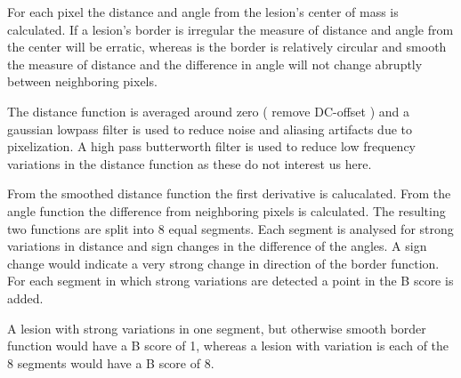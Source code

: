For each pixel the distance and angle from the lesion's center of mass is calculated. If a lesion's border is irregular the measure of distance and angle from the center will be erratic, whereas is the border is relatively circular and smooth the measure of distance and the difference in angle will not change abruptly between neighboring pixels.

The distance function is averaged around zero ( remove DC-offset ) and a gaussian lowpass filter is used to reduce noise and aliasing artifacts due to pixelization. A high pass butterworth filter is used to reduce low frequency variations in the distance function as these do not interest us here.

From the smoothed distance function the first derivative is calucalated. From the angle function the difference from neighboring pixels is calculated. The resulting two functions are split into 8 equal segments. Each segment is analysed for strong variations in distance and sign changes in the difference of the angles. A sign change would indicate a very strong change in direction of the border function. For each segment in which strong variations are detected a point in the B score is added.

A lesion with strong variations in one segment, but otherwise smooth border function would have a B score of 1, whereas a lesion with variation is each of the 8 segments would have a B score of 8.


